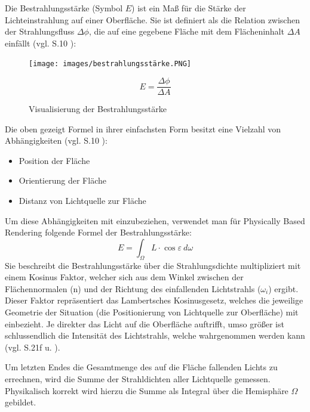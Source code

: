 \documentclass[
  11pt,
  a4paper,
  oneside
  ]{article}
\begin{document}
Die Bestrahlungsstärke (Symbol $E$) ist ein Maß für die Stärke der Lichteinstrahlung auf einer Oberfläche. Sie ist definiert als die Relation zwischen der Strahlungsfluss $\Delta \phi$, die auf eine gegebene Fläche mit dem Flächeninhalt $\Delta A$ einfällt 
(vgl. S.10 \cite{GrundlagenLichtTechnik}):
\begin{figure}[H]
  \centering
  \begin{minipage}{.5\textwidth}
    \centering
    \texttt{[image: images/bestrahlungsstärke.PNG]}
    \caption{Visualisierung der Bestrahlungsstärke}
    \label{fig:bestrahlungsstaerke}
  \end{minipage}%
  \hfill
  \begin{minipage}{.5\textwidth}
    \begin{equation}
      E=\dfrac{\Delta \phi}{\Delta A}
    \end{equation}
  \end{minipage}
\end{figure}

Die oben gezeigt Formel in ihrer einfachsten Form besitzt eine Vielzahl von Abhängig\-keiten (vgl. S.10 \cite{GrundlagenLichtTechnik}):
\begin{itemize}
  \item Position der Fläche
  \item Orientierung der Fläche
  \item Distanz von Lichtquelle zur Fläche
\end{itemize}

Um diese Abhängigkeiten mit einzubeziehen, verwendet man für Physically Based Rendering folgende Formel der Bestrahlungsstärke: 
\begin{equation}
  E=\int _{\Omega }L\cdot \cos \varepsilon \ d\omega
\end{equation}
Sie beschreibt die Bestrahlungsstärke über die Strahlungsdichte multipliziert mit einem Kosinus Faktor, welcher sich aus dem Winkel zwischen der Flächennormalen (n) und der Richtung des einfallenden Lichtstrahls ($\omega_{i}$) ergibt. Dieser Faktor repräsentiert das Lambertsches Kosinusgesetz, welches die jeweilige Geometrie der Situation (die Positionierung von Lichtquelle zur Oberfläche) mit einbezieht. Je direkter das Licht auf die Oberfläche auftrifft, umso größer ist schlussendlich die Intensität des Lichtstrahls, welche wahrgenommen werden kann 
(vgl. S.21f \cite{GRAY197813} u. \cite{Ryer97lightmeasurement,renderingEquationArticle}).

Um letzten Endes die Gesamtmenge des auf die Fläche fallenden Lichts zu errechnen, wird die Summe der Strahldichten aller Lichtquelle gemessen. Physikalisch korrekt wird hierzu die Summe als Integral über die Hemisphäre $\Omega$ gebildet. 
\end{document}
